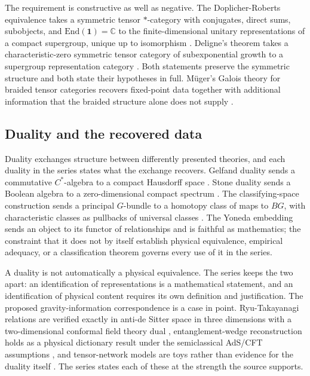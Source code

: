 \documentclass[11pt,letterpaper]{article}
\theoremstyle{definition}
\theoremstyle{remark}
\begin{document}
The requirement is constructive as well as negative. The Doplicher-Roberts equivalence takes a symmetric tensor $*$-category with conjugates, direct sums, subobjects, and $\mathrm{End}(\mathbf{1})=\mathbb{C}$ to the finite-dimensional unitary representations of a compact supergroup, unique up to isomorphism \cite{corpus-12,corpus-67}. Deligne's theorem takes a characteristic-zero symmetric tensor category of subexponential growth to a supergroup representation category \cite{corpus-13}. Both statements preserve the symmetric structure and both state their hypotheses in full. Müger's Galois theory for braided tensor categories recovers fixed-point data together with additional information that the braided structure alone does not supply \cite{corpus-21}.

\subsection{Duality and the recovered data}

Duality exchanges structure between differently presented theories, and each duality in the series states what the exchange recovers. Gelfand duality sends a commutative $C^*$-algebra to a compact Hausdorff space \cite{corpus-43}. Stone duality sends a Boolean algebra to a zero-dimensional compact spectrum \cite{corpus-44}. The classifying-space construction sends a principal $G$-bundle to a homotopy class of maps to $BG$, with characteristic classes as pullbacks of universal classes \cite{corpus-17,corpus-18}. The Yoneda embedding sends an object to its functor of relationships and is faithful as mathematics; the constraint that it does not by itself establish physical equivalence, empirical adequacy, or a classification theorem governs every use of it in the series.

A duality is not automatically a physical equivalence. The series keeps the two apart: an identification of representations is a mathematical statement, and an identification of physical content requires its own definition and justification. The proposed gravity-information correspondence is a case in point. Ryu-Takayanagi relations are verified exactly in anti-de Sitter space in three dimensions with a two-dimensional conformal field theory dual \cite{corpus-45}, entanglement-wedge reconstruction holds as a physical dictionary result under the semiclassical AdS/CFT assumptions \cite{corpus-46}, and tensor-network models are toys rather than evidence for the duality itself \cite{corpus-48}. The series states each of these at the strength the source supports.
\end{document}
